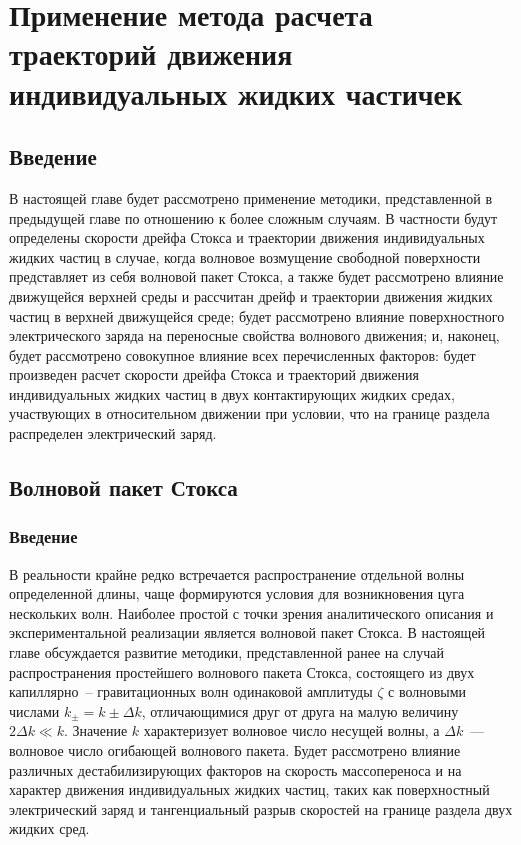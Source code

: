 \chapter{Применение метода расчета траекторий движения индивидуальных жидких частичек} \label{ch:ch3}

\section{Введение} \label{sec:ch3/sec1}

В настоящей главе будет рассмотрено применение методики, представленной в предыдущей главе по отношению к более сложным случаям. В частности будут определены скорости дрейфа Стокса и траектории движения индивидуальных жидких частиц в случае, когда волновое возмущение свободной поверхности представляет из себя волновой пакет Стокса, а также будет рассмотрено влияние движущейся верхней среды и рассчитан дрейф и траектории движения жидких частиц в верхней движущейся среде; будет рассмотрено влияние поверхностного электрического заряда на переносные свойства волнового движения; и, наконец, будет рассмотрено совокупное влияние всех перечисленных факторов: будет произведен расчет скорости дрейфа Стокса и траекторий движения индивидуальных жидких частиц в двух контактирующих жидких средах, участвующих в относительном движении при условии, что на границе раздела распределен электрический заряд.

\section{Волновой пакет Стокса}\label{sec:WP}
\subsection{Введение}

В реальности крайне редко встречается распространение отдельной волны определенной длины, чаще формируются условия для возникновения цуга нескольких волн. Наиболее простой с точки зрения аналитического описания и экспериментальной реализации является волновой пакет Стокса. В настоящей главе обсуждается развитие методики, представленной ранее на случай распространения простейшего волнового пакета Стокса, состоящего из двух капиллярно~-- гравитационных волн одинаковой амплитуды  $ \zeta $ с волновыми числами  $ k_{\pm}=k \pm \Delta k $, отличающимися друг от друга на малую величину  $ 2 \Delta k \ll k $. Значение $ k $  характеризует волновое число несущей волны, а  $ \Delta k $~--- волновое число огибающей волнового пакета. Будет рассмотрено влияние различных дестабилизирующих факторов на скорость массопереноса и на характер движения индивидуальных жидких частиц, таких как поверхностный электрический заряд и тангенциальный разрыв скоростей на границе раздела двух жидких сред.

